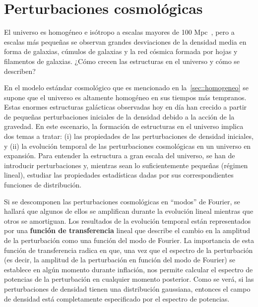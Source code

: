 \section{Perturbaciones cosmológicas}
El universo es homogéneo e isótropo a escalas mayores de 100 Mpc~\cite{baumann2022cosmology}, pero a escalas más pequeñas se observan grandes desviaciones de la densidad media en forma de galaxias, cúmulos de galaxias y la red cósmica formada por hojas y filamentos de galaxias. ¿Cómo crecen las estructuras en el universo y cómo se describen?

En el modelo estándar cosmológico que es mencionado en la~\autoref{sec::homogeneo} se supone que el universo es altamente homogéneo en sus tiempos más tempranos. Estas enormes estructuras galácticas observadas hoy en día han crecido a partir de pequeñas perturbaciones iniciales de la densidad debido a la acción de la gravedad. En este escenario, la formación de estructuras en el universo implica dos temas a tratar: (i) las propiedades de las perturbaciones de densidad iniciales, y (ii) la evolución temporal de las perturbaciones cosmológicas en un universo en expansión. Para entender la estructura a gran escala del universo, se han de introducir perturbaciones y, mientras sean lo suficientemente pequeñas (régimen lineal), estudiar las propiedades estadísticas dadas por sus correspondientes funciones de distribución.

Si se descomponen las perturbaciones cosmológicas en ``modos'' de Fourier, se hallará que algunos de ellos se amplifican durante la evolución lineal mientras que otros se amortiguan. Los resultados de la evolución temporal están representados por una \textbf{función de transferencia} lineal que describe el cambio en la amplitud de la perturbación como una función del modo de Fourier. La importancia de esta función de transferencia radica en que, una vez que el espectro de la perturbación (es decir, la amplitud de la perturbación en función del modo de Fourier) se establece en algún momento durante inflación, nos permite calcular el espectro de potencias de la perturbación en cualquier momento posterior. Como se verá, si las perturbaciones de densidad tienen una distribución gaussiana, entonces el campo de densidad está completamente especificado por el espectro de potencias.
